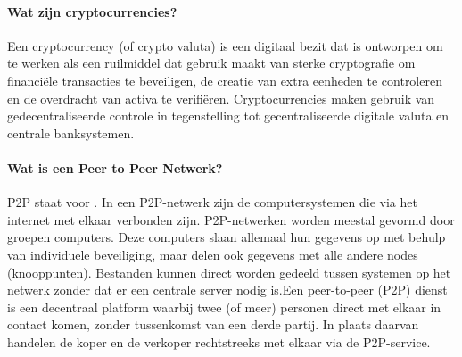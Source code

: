 \paragraph{Wat zijn cryptocurrencies?} Een cryptocurrency (of crypto valuta) is een digitaal bezit dat is ontworpen om te werken als een ruilmiddel dat gebruik maakt van sterke cryptografie om financi\"ele transacties te beveiligen, de creatie van extra eenheden te controleren en de overdracht van activa te verifi\"eren. Cryptocurrencies maken gebruik van gedecentraliseerde controle in tegenstelling tot gecentraliseerde digitale valuta en centrale banksystemen.

\paragraph{Wat is een Peer to Peer Netwerk?} P2P staat voor . In een P2P-netwerk zijn de  computersystemen die via het internet met elkaar verbonden zijn. P2P-netwerken worden meestal gevormd door groepen computers. Deze computers slaan allemaal hun gegevens op met behulp van individuele beveiliging, maar delen ook gegevens met alle andere nodes (knooppunten). Bestanden kunnen direct worden gedeeld tussen systemen op het netwerk zonder dat er een centrale server nodig is.Een peer-to-peer (P2P) dienst is een decentraal platform waarbij twee (of meer) personen direct met elkaar in contact komen, zonder tussenkomst van een derde partij. In plaats daarvan handelen de koper en de verkoper rechtstreeks met elkaar via de P2P-service. 



